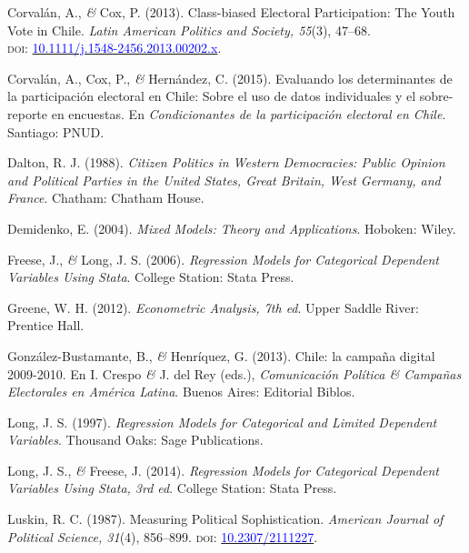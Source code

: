 \documentclass[a4paper]{tufte-handout}
\begin{document}
\begin{list}{}
\item{\small Corvalán, A., {\itshape \&} Cox, P. (2013). Class-biased Electoral Participation: The Youth Vote in Chile. {\itshape Latin American Politics and Society, 55}(3), 47--68. \\ {\scshape doi:} \href{https://doi.org/10.1111/j.1548-2456.2013.00202.x}{\textcolor{blue}{10.1111/j.1548-2456.2013.00202.x}}.}

\item{\small Corvalán, A., Cox, P., {\itshape \&} Hernández, C. (2015). Evaluando los determinantes de la participación electoral en Chile: Sobre el uso de datos individuales y el sobre-reporte en encuestas. En {\itshape Condicionantes de la participación electoral en Chile}. Santiago: PNUD.}

\item{\small Dalton, R. J. (1988). {\itshape Citizen Politics in Western Democracies: Public Opinion and Political Parties in the United States, Great Britain, West Germany, and France}. Chatham: Chatham House.}

\item{\small Demidenko, E. (2004). {\itshape Mixed Models: Theory and Applications}. Hoboken: Wiley.}

\item{\small Freese, J., {\itshape \&} Long, J. S. (2006). {\itshape Regression Models for Categorical Dependent Variables Using Stata}. College Station: Stata Press.}

\item{\small Greene, W. H. (2012). {\itshape Econometric Analysis, 7th ed}. Upper Saddle River: Prentice Hall.}

\item{\small González-Bustamante, B., {\itshape \&} Henríquez, G. (2013). Chile: la campaña digital 2009-2010. En I. Crespo {\itshape \&} J. del Rey (eds.), {\itshape Comunicación Política \& Campañas Electorales en América Latina}. Buenos Aires: Editorial Biblos.}

\item{\small Long, J. S. (1997). {\itshape Regression Models for Categorical and Limited Dependent Variables}. Thousand Oaks: Sage Publications.}

\item{\small Long, J. S., {\itshape \&} Freese, J. (2014). {\itshape Regression Models for Categorical Dependent Variables Using Stata, 3rd ed}. College Station: Stata Press.}

\item{\small Luskin, R. C. (1987). Measuring Political Sophistication. {\itshape American Journal of Political Science, 31}(4), 856--899. {\scshape doi:} \href{http://doi.org/10.2307/2111227}{\textcolor{blue}{10.2307/2111227}}.}


\end{list}
\end{document}
